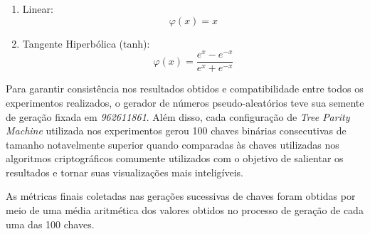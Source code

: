 \documentclass[12pt]{article}
\begin{document}
\begin{enumerate}
\begin{enumerate}
                    \item Linear:
                        \begin{equation}
                            \label{eq:act_func_linear}
                            \textit{$\varphi(x)$} = x
                        \end{equation}
                    
                    \item Tangente Hiperbólica (tanh):
                        \begin{equation}
                            \label{eq:act_func_tanh}
                            \textit{$\varphi(x)$} = \frac{e^x - e^{-x}}{e^x + e^{-x}}
                        \end{equation}
                
                \end{enumerate}
            \end{enumerate}
            
            Para garantir consistência nos resultados obtidos e compatibilidade entre todos os experimentos realizados, o gerador de números pseudo-aleatórios teve sua semente de geração fixada em \textit{962611861}. Além disso, cada configuração de \textit{Tree Parity Machine} utilizada nos experimentos gerou 100 chaves binárias consecutivas de tamanho notavelmente superior quando comparadas às chaves utilizadas nos algoritmos criptográficos comumente utilizados com o objetivo de salientar os resultados e tornar suas visualizações mais inteligíveis.
            
            As métricas finais coletadas nas gerações sucessivas de chaves foram obtidas por meio de uma média aritmética dos valores obtidos no processo de geração de cada uma das 100 chaves.
\end{document}
